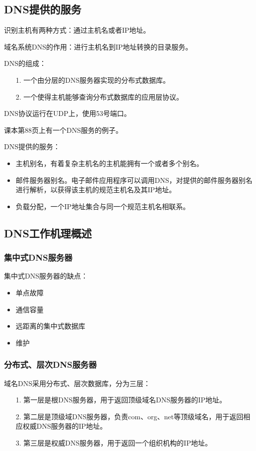 \documentclass[a4paper,left=2.5cm,right=2.5cm,11pt]{article}
\begin{document}
\subsection{DNS提供的服务}
	识别主机有两种方式：通过主机名或者IP地址。\par

	域名系统DNS的作用：进行主机名到IP地址转换的目录服务。\par

	DNS的组成：
	\begin{itemize}
		\item[1.] 一个由分层的DNS服务器实现的分布式数据库。
		\item[2.] 一个使得主机能够查询分布式数据库的应用层协议。
	\end{itemize}

	DNS协议运行在UDP上，使用53号端口。\par

	课本第88页上有一个DNS服务的例子。\par

	DNS提供的服务：
	\begin{itemize}
		\item 主机别名，有着复杂主机名的主机能拥有一个或者多个别名。
		\item 邮件服务器别名。电子邮件应用程序可以调用DNS，对提供的邮件服务器别名进行解析，以获得该主机的规范主机名及其IP地址。
		\item 负载分配，一个IP地址集合与同一个规范主机名相联系。
	\end{itemize}

\subsection{DNS工作机理概述}
\subsubsection{集中式DNS服务器}
	集中式DNS服务器的缺点：
	\begin{itemize}
		\item 单点故障
		\item 通信容量
		\item 远距离的集中式数据库
		\item 维护
	\end{itemize}

\subsubsection{分布式、层次DNS服务器}
	域名DNS采用分布式、层次数据库，分为三层：
	\begin{itemize}
		\item[1.] 第一层是根DNS服务器，用于返回顶级域名DNS服务器的IP地址。
		\item[2.] 第二层是顶级域DNS服务器，负责com、org、net等顶级域名，用于返回相应权威DNS服务器的IP地址。
		\item[3.] 第三层是权威DNS服务器，用于返回一个组织机构的IP地址。
	\end{itemize}
\end{document}
